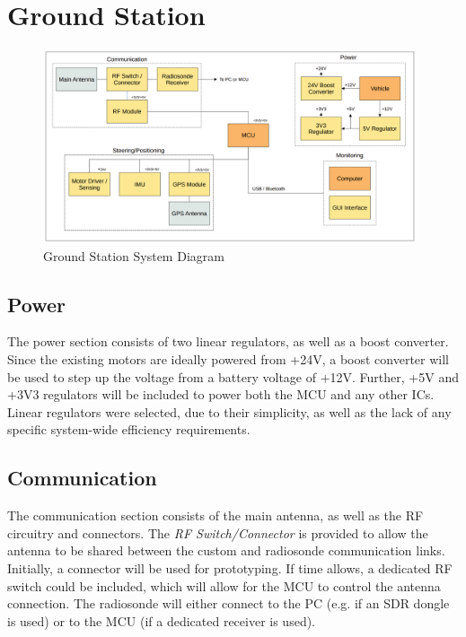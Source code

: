 \graphicspath{{./figures}}

\section{Ground Station}

\begin{figure}[!htb]
  \centering
  \includegraphics[width=0.98\textwidth]{gs_system}
  \caption{Ground Station System Diagram}
  \label{fig:gs_system}
\end{figure}

\subsection{Power}
The power section consists of two linear regulators, as well as a boost converter. Since the existing motors are ideally powered from +24V, a boost converter will be used to step up the voltage from a battery voltage of +12V. Further, +5V and +3V3 regulators will be included to power both the MCU and any other ICs. Linear regulators were selected, due to their simplicity, as well as the lack of any specific system-wide efficiency requirements.

\subsection{Communication}
The communication section consists of the main antenna, as well as the RF circuitry and connectors. The \textit{RF Switch/Connector} is provided to allow the antenna to be shared between the custom and radiosonde communication links. Initially, a connector will be used for prototyping. If time allows, a dedicated RF switch could be included, which will allow for the MCU to control the antenna connection. The radiosonde will either connect to the PC (e.g. if an SDR dongle is used) or to the MCU (if a dedicated receiver is used).

